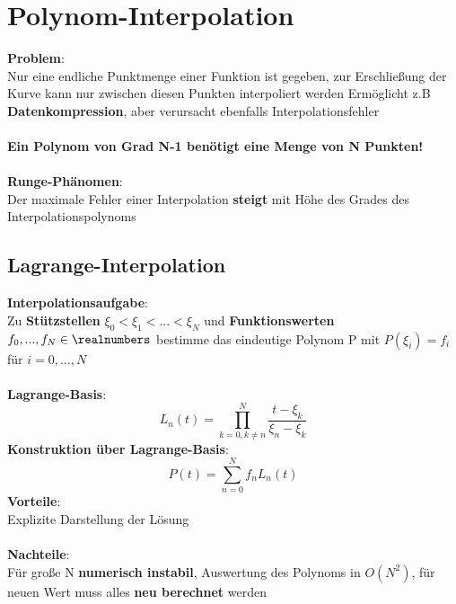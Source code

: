 \section{Polynom-Interpolation}%
\label{pi:sec:polynom-interpolation}

\textbf{Problem}:\\Nur eine endliche Punktmenge einer Funktion ist gegeben, zur Erschließung der Kurve kann nur zwischen diesen Punkten interpoliert werden
Ermöglicht z.B \textbf{Datenkompression}, aber verursacht ebenfalls Interpolationsfehler\\\\
\textbf{Ein Polynom von Grad N-1 benötigt eine Menge von N Punkten!}\\\\
\textbf{Runge-Phänomen}:\\Der maximale Fehler einer Interpolation \textbf{steigt} mit Höhe des Grades des Interpolationspolynoms

\subsection{Lagrange-Interpolation}%
\label{pi:sub:lagrange-interpolation}
\textbf{Interpolationsaufgabe}:\\Zu \textbf{Stützstellen} $\xi_0 < \xi_1 < ... < \xi_N$ und \textbf{Funktionswerten} $f_0, ..., f_N \in \realnumbers$ bestimme das eindeutige Polynom P mit $P(\xi_i) = f_i$ für $i = 0, ..., N$\\\\
\textbf{Lagrange-Basis}: $$L_n(t) = \prod^{N}_{k = 0, k \neq n} \frac{t - \xi_k}{\xi_n - \xi_k}$$
\textbf{Konstruktion über Lagrange-Basis}: $$P(t) = \sum^N_{n = 0}f_nL_n(t)$$
\textbf{Vorteile}:\\Explizite Darstellung der Lösung\\\\
\textbf{Nachteile}:\\Für große N \textbf{numerisch instabil}, Auswertung des Polynoms in $O(N^2)$, für neuen Wert muss alles \textbf{neu berechnet} werden

